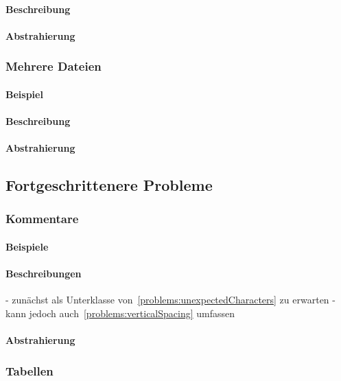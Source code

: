 \paragraph*{Beschreibung}
\paragraph*{Abstrahierung}


\subsubsection{Mehrere Dateien}\label{problems:multifile}
\paragraph*{Beispiel}
\paragraph*{Beschreibung}
\paragraph*{Abstrahierung}

\subsection{Fortgeschrittenere Probleme}\label{problems:advanced}
\subsubsection{Kommentare}
\paragraph*{Beispiele}
\paragraph*{Beschreibungen}
- zunächst als Unterklasse von~\ref{problems:unexpectedCharacters} zu erwarten
- kann jedoch auch~\ref{problems:verticalSpacing} umfassen
\paragraph*{Abstrahierung}

\subsubsection{Tabellen}\label{problems:tables}
